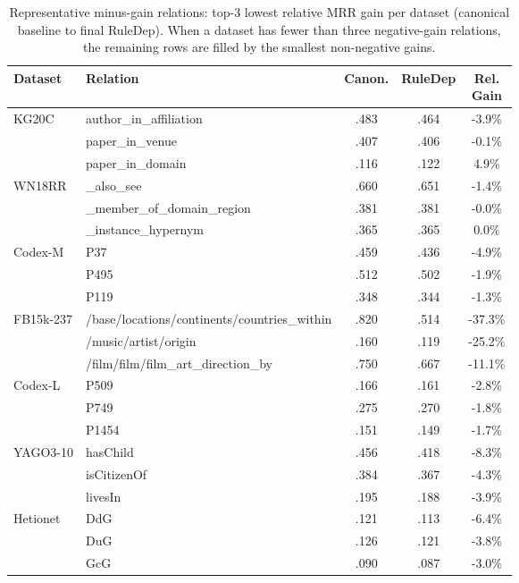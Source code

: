 \begin{table}[t]
\centering
\caption{Representative minus-gain relations: top-3 lowest relative MRR gain per dataset (canonical baseline to final RuleDep). When a dataset has fewer than three negative-gain relations, the remaining rows are filled by the smallest non-negative gains.}
\label{tab:relation-top3-minus-gain}
\setlength{\tabcolsep}{3pt}
\renewcommand{\arraystretch}{1.05}
\footnotesize
\begin{tabular}{llccc}
\toprule
Dataset & Relation & Canon. & RuleDep & \makecell{Rel.\\Gain} \\
\midrule
\multirow{3}{*}{KG20C} & author\_in\_affiliation & .483 & .464 & -3.9\% \\
 & paper\_in\_venue & .407 & .406 & -0.1\% \\
 & paper\_in\_domain & .116 & .122 & 4.9\% \\
\multirow{3}{*}{WN18RR} & \_also\_see & .660 & .651 & -1.4\% \\
 & \_member\_of\_domain\_region & .381 & .381 & -0.0\% \\
 & \_instance\_hypernym & .365 & .365 & 0.0\% \\
\multirow{3}{*}{Codex-M} & P37 & .459 & .436 & -4.9\% \\
 & P495 & .512 & .502 & -1.9\% \\
 & P119 & .348 & .344 & -1.3\% \\
\multirow{3}{*}{FB15k-237} & /base/locations/continents/countries\_within & .820 & .514 & -37.3\% \\
 & /music/artist/origin & .160 & .119 & -25.2\% \\
 & /film/film/film\_art\_direction\_by & .750 & .667 & -11.1\% \\
\multirow{3}{*}{Codex-L} & P509 & .166 & .161 & -2.8\% \\
 & P749 & .275 & .270 & -1.8\% \\
 & P1454 & .151 & .149 & -1.7\% \\
\multirow{3}{*}{YAGO3-10} & hasChild & .456 & .418 & -8.3\% \\
 & isCitizenOf & .384 & .367 & -4.3\% \\
 & livesIn & .195 & .188 & -3.9\% \\
\multirow{3}{*}{Hetionet} & DdG & .121 & .113 & -6.4\% \\
 & DuG & .126 & .121 & -3.8\% \\
 & GcG & .090 & .087 & -3.0\% \\
\bottomrule
\end{tabular}
\end{table}

